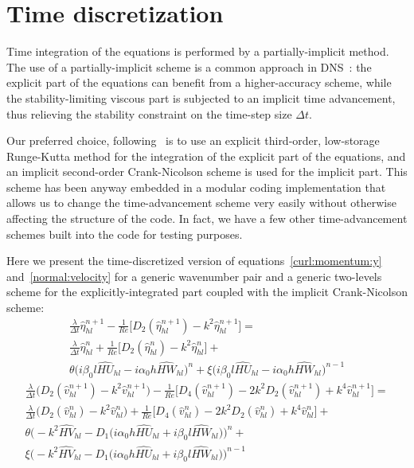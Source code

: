 

\section{Time discretization}
Time integration of the equations is performed by a partially-implicit method.
The use of a partially-implicit scheme is a common approach in DNS~\cite{kim_moin_moser}: the explicit part of the equations can benefit from a higher-accuracy scheme, while the stability-limiting viscous part is subjected to an implicit time advancement, thus relieving the stability constraint on the time-step size $	\Delta t$. \par
Our preferred choice, following~\cite{cpl:presentazione}\cite{kim_moin_moser} is to use an explicit third-order, low-storage Runge-Kutta method for the integration of the explicit part of the equations, and an implicit second-order Crank-Nicolson scheme is used for the implicit part. This scheme has been anyway embedded in a modular coding implementation that allows us to change the time-advancement scheme very easily without otherwise affecting the structure of the code. In fact, we have a few other time-advancement schemes built into the code for testing purposes. \par
 Here we present the time-discretized version of equations~\ref{curl:momentum:y} and~\ref{normal:velocity} for a generic wavenumber pair and a generic two-levels scheme for the explicitly-integrated part coupled with the implicit Crank-Nicolson scheme:
\begin{multline}
\frac{\lambda}{\Delta t} \hat{\eta}_{hl}^{n+1} -\frac{1}{Re} \big[ D_{2} (\hat{\eta}_{hl}^{n+1}) - k^{2} \hat{\eta}_{hl}^{n+1} \big] = \\
\frac{\lambda}{\Delta t} \hat{\eta}_{hl}^{n} + \frac{1}{Re} \big[ D_{2} (\hat{\eta}_{hl}^{n}) - k^{2} \hat{\eta}_{hl}^{n} \big] + \\
\theta \bigg( i\beta_{0}l\widehat{HU}_{hl} - i\alpha_{0}h\widehat{HW}_{hl} \bigg)^{n} + \xi \bigg( i\beta_{0}l\widehat{HU}_{hl} - i\alpha_{0}h \widehat{HW}_{hl} \bigg)^{n-1}
\end{multline}
\begin{multline}
\frac{\lambda}{\Delta t} \big( D_{2} (\hat{v}_{hl}^{n+1}) - k^{2} \hat{v}_{hl}^{n+1} \big) -\frac{1}{Re} \big[ D_{4} (\hat{v}_{hl}^{n+1}) -2 k^{2} D_{2} (\hat{v}_{hl}^{n+1}) + k^{4} \hat{v}_{hl}^{n+1} \big] =\\
\frac{\lambda}{\Delta t} \big( D_{2}(\hat{v}_{hl}^{n}) - k^{2}\hat{v}_{hl}^{n} \big) + \frac{1}{Re} \big[ D_{4} (\hat{v}_{hl}^{n}) -2 k^{2} D_{2} (\hat{v}_{hl}^{n}) + k^{4} \hat{v}_{hl}^{n} \big]+ \\
\theta \bigg( -k^{2} \widehat{HV}_{hl} -D_{1} \big( i\alpha_{0} h \widehat{HU}_{hl} + i\beta_{0} l \widehat{HW}_{hl} \big)  \bigg)^{n} + \\
\xi \bigg( -k^{2} \widehat{HV}_{hl} -D_{1} \big( i\alpha_{0}h\widehat{HU}_{hl} + i\beta_{0}l \widehat{HW}_{hl} \big) \bigg)^{n-1}
\end{multline}

